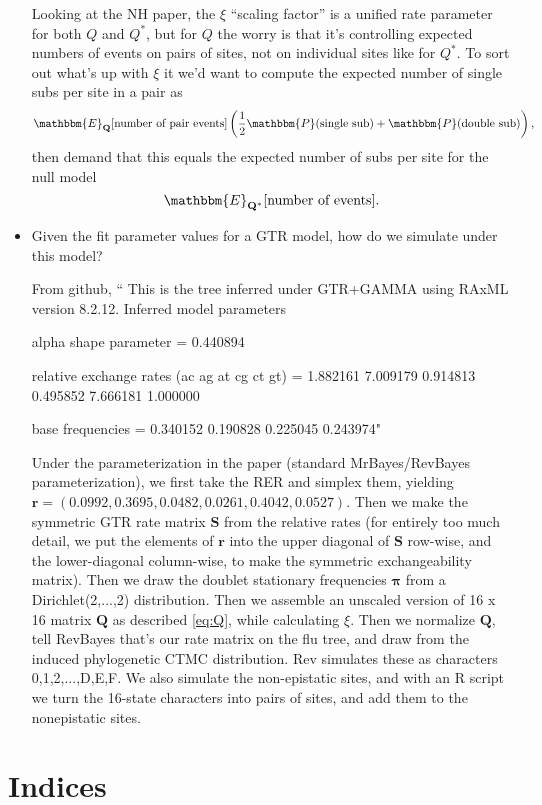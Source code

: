 \documentclass[11pt]{article}
\begin{document}
\begin{itemize}
Looking at the NH paper, the $\xi$ ``scaling factor'' is a unified rate parameter for both $Q$ and $Q^*$, but for $Q$ the worry is that it's controlling expected numbers of events on pairs of sites, not on individual sites like for $Q^*$.
To sort out what's up with $\xi$ it we'd want to compute the expected number of single subs per site in a pair as
\[
\mathbbm{E}_\mathbf{Q}[\text{number of pair events}]\left(\frac{1}{2}\mathbbm{P}(\text{single sub})+\mathbbm{P}(\text{double sub})\right),
\]
then demand that this equals the expected number of subs per site for the null model
\[
\mathbbm{E}_\mathbf{Q^*}[\text{number of events}].
\]


\item Given the fit parameter values for a GTR model, how do we simulate under this model?

From github, ``
This is the tree inferred under GTR+GAMMA using RAxML version 8.2.12.
Inferred model parameters

alpha shape parameter = 0.440894

relative exchange rates (ac ag at cg ct gt) = 1.882161 7.009179 0.914813 0.495852 7.666181 1.000000

base frequencies = 0.340152 0.190828 0.225045 0.243974"

Under the parameterization in the paper (standard MrBayes/RevBayes parameterization), we first take the RER and simplex them, yielding $\boldsymbol{r} = (0.0992,0.3695,0.0482,0.0261,0.4042,0.0527)$.
Then we make the symmetric GTR rate matrix $\boldsymbol{S}$ from the relative rates (for entirely too much detail, we put the elements of $\boldsymbol{r}$ into the upper diagonal of $\boldsymbol{S}$ row-wise, and the lower-diagonal column-wise, to make the symmetric exchangeability matrix).
Then we draw the doublet stationary frequencies $\boldsymbol{\pi}$ from a Dirichlet(2,...,2) distribution.
Then we assemble an unscaled version of 16 x 16 matrix $\boldsymbol{Q}$ as described \ref{eq:Q}, while calculating $\xi$.
Then we normalize $\boldsymbol{Q}$, tell RevBayes that's our rate matrix on the flu tree, and draw from the induced phylogenetic CTMC distribution.
Rev simulates these as characters 0,1,2,...,D,E,F.
We also simulate the non-epistatic sites, and with an R script we turn the 16-state characters into pairs of sites, and add them to the nonepistatic sites.

\end{itemize}

\section*{Indices}
\end{document}
